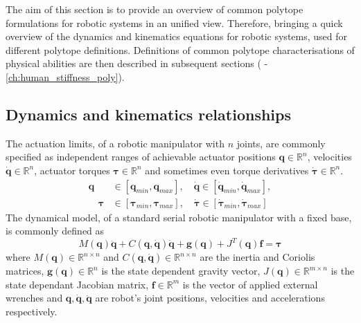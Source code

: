 The aim of this section is to provide an overview of common polytope formulations for robotic systems in an unified view.  Therefore,  bringing a quick overview of the dynamics and kinematics equations for robotic systems, used for different polytope definitions. Definitions 
of common polytope characterisations of physical abilities are then described in subsequent sections ( - \ref{ch:human_stiffness_poly}).

\subsection{Dynamics and kinematics relationships}
\label{ch:robot_dyn_kin}
The actuation limits, of a robotic manipulator with $n$ joints, are commonly specified as independent ranges of achievable actuator positions $\bm{q}\in \mathbb{R}^n$, velocities $\dot{\bm{q}}\in \mathbb{R}^n$, actuator torques $\bm{\tau}\in \mathbb{R}^n$ and sometimes even torque derivatives $\dot{\bm{\tau}}\in \mathbb{R}^n$.
\begin{subequations}
\begin{align}
\bm{q} &\in [ {\bm{q}}_{min}, {\bm{q}}_{max}], \quad\dot{\bm{q}} \in [\dot{\bm{q}}_{min},  \dot{\bm{q}}_{max}], \\
\quad\bm{\tau} &\in [\bm{\tau}_{min},  \bm{\tau}_{max}],
\quad\dot{\bm{\tau}} \in [\dot{\bm{\tau}}_{min},  \dot{\bm{\tau}}_{max}] \label{eq:dyn_limits:torque}
\end{align}
\label{eq:dyn_limits}
\end{subequations}
The dynamical model, of a standard serial robotic manipulator with a fixed base, is commonly defined as
\begin{equation}
M(\bm{q})\ddot{\bm{q}} + C(\bm{q},\dot{\bm{q}})\dot{\bm{q}} + \bm{g}(\bm{q}) + J^T(\bm{q})\bm{f} = \bm{\tau} 
\label{eq:dyn_model_rob}
\end{equation}
where $M(\bm{q}) \in \mathbb{R}^{n \times n}$ and $C(\bm{q},\dot{\bm{q}})\in \mathbb{R}^{n \times n}$ are the inertia and Coriolis matrices, $\bm{g} (\bm{q})\in \mathbb{R}^n$ is the state dependent gravity vector, $J(\bm{q}) \in \mathbb{R}^{m\times n}$ is the state dependant Jacobian matrix, $\bm{f}\in \mathbb{R}^m $ is the vector of applied external wrenches and $\bm{q},\dot{\bm{q}},\ddot{\bm{q}}$ are robot's joint positions, velocities and accelerations respectively.

